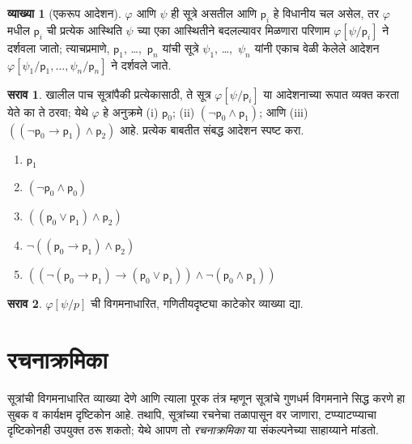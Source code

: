 \documentclass[11pt,a4paper,openany]{book}
\theoremstyle{definition}
\newtheorem{defn}{व्याख्या}[section]
\newtheorem{prob}{सराव}[chapter]
\newcommand{\lif}{\mathbin{\to}}
\newcommand{\Obj}[1]{\mathsf{#1}}
\newcommand{\subst}[2]{#1/#2}
\newcommand{\SSubst}[2]{#1[#2]}
\newcommand{\Subst}[3]{#1[\subst{#2}{#3}]}
\begin{document}
\begin{defn}[एकरूप आदेशन]
$\varphi$ आणि $\psi$ ही सूत्रे असतील आणि $\Obj p_i$ हे विधानीय चल असेल, तर $\varphi$ मधील $\Obj p_i$ ची प्रत्येक
आस्थिति $\psi$ च्या एका आस्थितीने बदलल्यावर मिळणारा परिणाम
$\Subst{\varphi}{\psi}{\Obj p_i}$ ने दर्शवला जातो; त्याचप्रमाणे,
$\Obj p_1$, \dots,~$\Obj p_n$ यांची सूत्रे $\psi_1$,
\dots,~$\psi_n$ यांनी एकाच वेळी केलेले आदेशन
$\SSubst{\varphi}{\subst{\psi_1}{\Obj p_1},\dots,\subst{\psi_n}{\Obj p_n}}$
ने दर्शवले जाते.
\end{defn}

\begin{prob} खालील पाच सूत्रांपैकी प्रत्येकासाठी, ते
 सूत्र \( \Subst{\varphi}{\psi}{\Obj p_i} \) या आदेशनाच्या रूपात व्यक्त
 करता येते का ते ठरवा; येथे \( \varphi \) हे अनुक्रमे (i) \( \Obj p_0 \);
 (ii) \( ( \lnot \Obj p_0 \land \Obj p_1) \); आणि (iii)
 \( ( ( \lnot \Obj p_0 \lif \Obj p_1 ) \land \Obj p_2 ) \) आहे.
 प्रत्येक बाबतीत संबद्ध आदेशन स्पष्ट करा.
  \begin{enumerate}
    \item \( \Obj p_1 \)
    \item \( ( \lnot \Obj p_0 \land \Obj p_0 ) \)
    \item \( ( ( \Obj p_0 \lor \Obj p_1 ) \land \Obj p_2 )  \)
    \item \( \lnot ( ( \Obj p_0 \lif \Obj p_1 ) \land \Obj p_2 ) \)
    \item \( (( \lnot ( \Obj p_0 \lif \Obj p_1 ) \lif ( \Obj p_0 \lor \Obj p_1 )) \land \lnot ( \Obj p_0 \land \Obj p_1 )) \)
  \end{enumerate}
\end{prob}

\begin{prob}
$\Subst{\varphi}{\psi}{p}$ ची विगमनाधारित, गणितीयदृष्ट्या काटेकोर व्याख्या
द्या.
\end{prob}









\section{रचनाक्रमिका}\label{pl:syn:fseq:sec}

सूत्रांची विगमनाधारित व्याख्या देणे आणि त्याला पूरक तंत्र म्हणून
सूत्रांचे गुणधर्म विगमनाने सिद्ध करणे हा सुबक व कार्यक्षम
दृष्टिकोन आहे. तथापि, सूत्रांच्या रचनेचा तळापासून वर जाणारा,
टप्प्याटप्प्याचा दृष्टिकोनही उपयुक्त ठरू शकतो; येथे आपण तो
\emph{रचनाक्रमिका} या संकल्पनेच्या साहाय्याने मांडतो.
\end{document}
